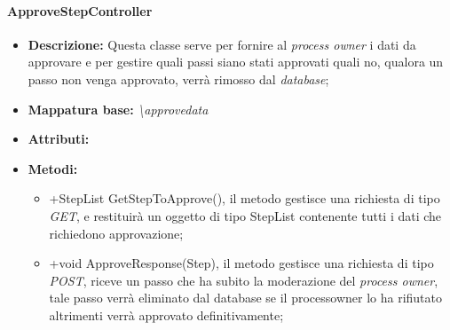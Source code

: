 \paragraph{ApproveStepController}%
\begin{itemize}
	\item \textbf{Descrizione: } Questa classe serve per fornire al \textit{process owner} i dati da approvare e per gestire quali passi siano stati approvati quali no, qualora un passo non venga approvato, verrà rimosso dal \textit{database};
	\item \textbf{Mappatura base: } \textit{\textbackslash approvedata}
	\item \textbf{Attributi: } 
	\item \textbf{Metodi: }\begin{itemize}
					\item +StepList GetStepToApprove(), il metodo gestisce una richiesta di tipo \textit{GET}, e restituirà un oggetto di tipo StepList contenente tutti i dati che richiedono approvazione;
					\item +void ApproveResponse(Step), il metodo gestisce una richiesta di tipo \textit{POST}, riceve un passo che ha subito la moderazione del \textit{process owner}, tale passo verrà eliminato dal database se il processowner lo ha rifiutato altrimenti verrà approvato definitivamente;  
				\end{itemize}
\end{itemize}